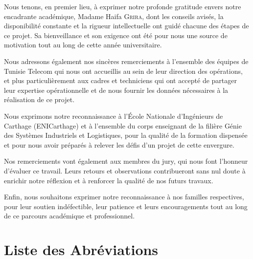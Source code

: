 \documentclass[11pt,a4paper]{report}
\begin{document}
Nous tenons, en premier lieu, à exprimer notre profonde gratitude envers notre encadrante académique, Madame Haifa \textsc{Grira}, dont les conseils avisés, la disponibilité constante et la rigueur intellectuelle ont guidé chacune des étapes de ce projet. Sa bienveillance et son exigence ont été pour nous une source de motivation tout au long de cette année universitaire.

Nous adressons également nos sincères remerciements à l'ensemble des équipes de Tunisie Telecom qui nous ont accueillis au sein de leur direction des opérations, et plus particulièrement aux cadres et techniciens qui ont accepté de partager leur expertise opérationnelle et de nous fournir les données nécessaires à la réalisation de ce projet.

Nous exprimons notre reconnaissance à l'École Nationale d'Ingénieurs de Carthage (ENICarthage) et à l'ensemble du corps enseignant de la filière Génie des Systèmes Industriels et Logistiques, pour la qualité de la formation dispensée et pour nous avoir préparés à relever les défis d'un projet de cette envergure.

Nos remerciements vont également aux membres du jury, qui nous font l'honneur d'évaluer ce travail. Leurs retours et observations contribueront sans nul doute à enrichir notre réflexion et à renforcer la qualité de nos futurs travaux.

Enfin, nous souhaitons exprimer notre reconnaissance à nos familles respectives, pour leur soutien indéfectible, leur patience et leurs encouragements tout au long de ce parcours académique et professionnel.

\chapter*{Liste des Abréviations}
\end{document}

